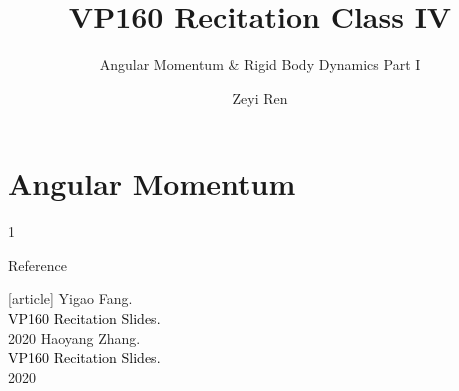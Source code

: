 \documentclass{beamer}
\title{VP160 Recitation Class IV}
\subtitle{Angular Momentum & Rigid Body Dynamics Part I}
\author{Zeyi Ren}
\institute{UM-SJTU Joint Institute}
\begin{document}
\maketitle

\frame{\tableofcontents}

\section{Angular Momentum}
\begin{frame}
  1
\end{frame}

\begin{frame}{Reference}
  \begin{thebibliography}{9}
  [article]
   Yigao Fang.\\
  \textcolor{black}{VP160 Recitation Slides.}\\
  2020
   Haoyang Zhang.\\
  \textcolor{black}{VP160 Recitation Slides.}\\
  2020
  \end{thebibliography}
  \end{frame}
  
\end{document}
